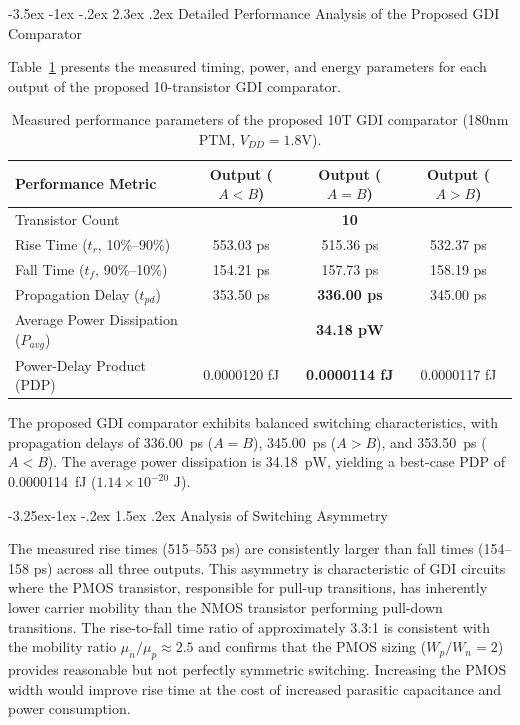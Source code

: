\documentclass[12pt,a4paper,oneside]{report}
\makeatletter
\renewcommand\section{\@startsection {section}{1}{\z@}%
                                   {-3.5ex \@plus -1ex \@minus -.2ex}%
                                   {2.3ex \@plus.2ex}%
                                   {\normalfont\normalsize\bfseries}}
\renewcommand\subsection{\@startsection{subsection}{2}{\z@}%
                                     {-3.25ex\@plus -1ex \@minus -.2ex}%
                                     {1.5ex \@plus .2ex}%
                                     {\normalfont\normalsize\bfseries\itshape}}
\makeatother
\begin{document}
\section{Detailed Performance Analysis of the Proposed GDI Comparator}

Table~\ref{tab:res_gdi_full} presents the measured timing, power, and energy parameters for each output of the proposed 10-transistor GDI comparator.

\begin{table}[H]
\centering
\caption{Measured performance parameters of the proposed 10T GDI comparator (180nm PTM, $V_{DD}=1.8\text{V}$).}
\label{tab:res_gdi_full}
\vspace{0.2cm}
\begin{tabular}{|l|c|c|c|}
\hline
\textbf{Performance Metric} & \textbf{Output ($A<B$)} & \textbf{Output ($A=B$)} & \textbf{Output ($A>B$)} \\
\hline
Transistor Count & \multicolumn{3}{c|}{\textbf{10}} \\
\hline
Rise Time ($t_r$, 10\%--90\%) & 553.03 ps & 515.36 ps & 532.37 ps \\
\hline
Fall Time ($t_f$, 90\%--10\%) & 154.21 ps & 157.73 ps & 158.19 ps \\
\hline
Propagation Delay ($t_{pd}$) & 353.50 ps & \textbf{336.00 ps} & 345.00 ps \\
\hline
Average Power Dissipation ($P_{avg}$) & \multicolumn{3}{c|}{\textbf{34.18 pW}} \\
\hline
Power-Delay Product (PDP) & 0.0000120 fJ & \textbf{0.0000114 fJ} & 0.0000117 fJ \\
\hline
\end{tabular}
\end{table}

The proposed GDI comparator exhibits balanced switching characteristics, with propagation delays of 336.00~ps ($A=B$), 345.00~ps ($A>B$), and 353.50~ps ($A<B$). The average power dissipation is 34.18~pW, yielding a best-case PDP of 0.0000114~fJ ($1.14\times 10^{-20}\text{ J}$).

\subsection{Analysis of Switching Asymmetry}

The measured rise times (515--553 ps) are consistently larger than fall times (154--158 ps) across all three outputs. This asymmetry is characteristic of GDI circuits where the PMOS transistor, responsible for pull-up transitions, has inherently lower carrier mobility than the NMOS transistor performing pull-down transitions. The rise-to-fall time ratio of approximately 3.3:1 is consistent with the mobility ratio $\mu_n/\mu_p \approx 2.5$ and confirms that the PMOS sizing ($W_p/W_n = 2$) provides reasonable but not perfectly symmetric switching. Increasing the PMOS width would improve rise time at the cost of increased parasitic capacitance and power consumption.
\end{document}
